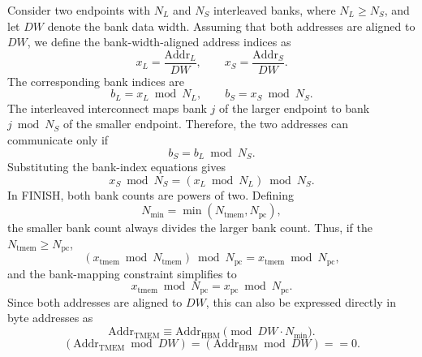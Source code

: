 \documentclass[sigconf,anonymous,nonacm]{acmart}
\begin{document}
Consider two endpoints with $N_L$ and $N_S$ interleaved banks,
where $N_L \geq N_S$, and let $DW$ denote the bank data width.
Assuming that both addresses are aligned to $DW$, we define
the bank-width-aligned address indices as
%
\begin{equation}
x_L = \frac{\mathrm{Addr}_L}{DW},
\qquad
x_S = \frac{\mathrm{Addr}_S}{DW}.
\end{equation}
%
The corresponding bank indices are
%
\begin{equation}
b_L = x_L \bmod N_L,
\qquad
b_S = x_S \bmod N_S.
\end{equation}
%
The interleaved interconnect maps bank $j$ of the larger endpoint
to bank $j \bmod N_S$ of the smaller endpoint. Therefore, the
two addresses can communicate only if
%
\begin{equation}
b_S = b_L \bmod N_S.
\end{equation}
%
Substituting the bank-index equations gives
%
\begin{equation}
x_S \bmod N_S
=
\left(
x_L \bmod N_L
\right)
\bmod N_S.
\label{eq:general_interleaved_constraint}
\end{equation}
In FINISH, both bank counts are powers of two.
Defining
%
\begin{equation}
N_{\min}
=
\min
\left(
N_{\mathrm{tmem}},
N_{\mathrm{pc}}
\right),
\end{equation}
%
the smaller bank count always divides the larger bank count.
Thus, if the $N_{\mathrm{tmem}} \geq N_{\mathrm{pc}}$,
%
\begin{equation}
\left(
x_{\mathrm{tmem}} \bmod N_{\mathrm{tmem}}
\right)
\bmod N_{\mathrm{pc}}
=
x_{\mathrm{tmem}} \bmod N_{\mathrm{pc}},
\end{equation}
%
and the bank-mapping constraint simplifies to
%
\begin{equation}
x_{\mathrm{tmem}} \bmod N_{\mathrm{pc}}
=
x_{\mathrm{pc}} \bmod N_{\mathrm{pc}}.
\label{eq:simplified_interleaved_constraint}
\end{equation}
%
Since both addresses are aligned to $DW$, this can also be
expressed directly in byte addresses as
%
\begin{equation}
\mathrm{Addr}_{\mathrm{TMEM}}
\equiv
\mathrm{Addr}_{\mathrm{HBM}}
\pmod{DW \cdot N_{\min}}.
\label{eq:interleaved_address_constraint}
\end{equation}
\begin{equation}
(\mathrm{Addr}_{\mathrm{TMEM}} \bmod DW)
=
(\mathrm{Addr}_{\mathrm{HBM}} \bmod DW)
==
0.
\label{eq:interleaved_address_constraint}
\end{equation}
\end{document}
